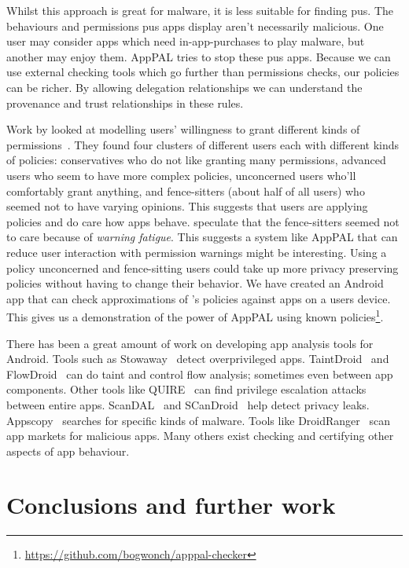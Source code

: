 \documentclass[]{scrartcl}
\newcommand{\comment}[1]{}%
\begin{document}
Whilst this approach is great for malware, it is less suitable for finding \ac{pus}.
The behaviours and permissions \ac{pus} apps display aren't necessarily malicious.
One user may consider apps which need in-app-purchases to play malware, but another may enjoy them.
AppPAL tries to stop these \ac{pus} apps.
Because we can use external checking tools which go further than permissions checks, our policies can be richer.
By allowing delegation relationships we can understand the provenance and trust relationships in these rules.

Work by \citeauthor{Sadeh:2014vq} looked at modelling users' willingness to grant different kinds of permissions~\citep{Sadeh:2014vq}.
They found four clusters of different users each with different kinds of policies:
  conservatives who do not like granting many permissions,
  advanced users who seem to have more complex policies,
  unconcerned users who'll comfortably grant anything,
  and fence-sitters (about half of all users) who seemed not to have varying opinions.
This suggests that users are applying policies and do care how apps behave.
\citeauthor{Sadeh:2014vq} speculate that the fence-sitters seemed not to care because of \emph{warning fatigue}.
This suggests a system like AppPAL that can reduce user interaction with permission warnings might be interesting.
Using a policy unconcerned and fence-sitting users could take up more privacy preserving policies without having to change their behavior.
We have created an Android app that can check approximations of \citeauthor{Sadeh:2014vq}'s policies against apps on a users device.
This gives us a demonstration of the power of AppPAL using known policies\footnote{\url{https://github.com/bogwonch/apppal-checker}}.

There has been a great amount of work on developing app analysis tools for Android.
Tools such as Stowaway~\citep{Felt:2011kj} detect overprivileged apps.
TaintDroid~\citep{Enck:2010uw} and FlowDroid~\citep{Fritz:2013vi} can do taint and control flow analysis; sometimes even between app components.
Other tools like QUIRE~\citep{Bugiel:2012ui} can find privilege escalation attacks between entire apps.
ScanDAL~\citep{Kim:2012vt} and SCanDroid~\citep{Fuchs:2009vi} help detect privacy leaks.
Appscopy~\citep{Feng:kPGZr_ja} searches for specific kinds of malware.
Tools like DroidRanger~\citep{Zhou:2012tb} scan app markets for malicious apps.
Many others exist checking and certifying other aspects of app behaviour.

\section{Conclusions and further work \comment{$\frac{1}{2}$ page}}
\end{document}
